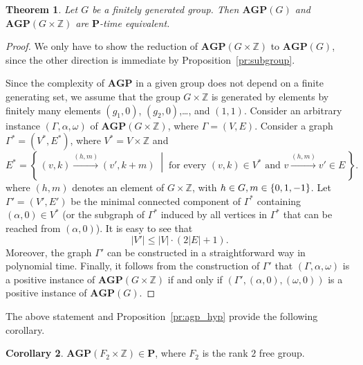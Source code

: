 \documentclass[10pt]{amsart}
\newcommand{\Set}[2]{\left\{\, #1 \;\middle|\; #2 \,\right\}}%
\newtheorem{theorem}{Theorem}[section]
\theoremstyle{definition}
\newtheorem{corollary}[theorem]{Corollary}
\def\P{{\mathbf{P}}}
\def\AGP{{\mathbf{AGP}}}
\begin{document}
\begin{theorem}\label{th:kill_z}
Let $G$ be a finitely generated group. Then $\AGP(G)$ and $\AGP(G\times \mathbb Z)$ are $\P$-time equivalent.
\end{theorem}

\begin{proof}
We only have to show the reduction of $\AGP(G\times\mathbb Z)$ to $\AGP(G)$, since the other direction is immediate by Proposition~\ref{pr:subgroup}.

Since the complexity of $\AGP$ in a given group does not depend on a finite generating set, we assume that the group $G\times\mathbb Z$ is generated by elements by finitely many elements $(g_1,0)$, $(g_2,0)$,\ldots, and $(1,1)$. Consider an arbitrary instance $(\Gamma,\alpha,\omega)$ of $\AGP(G\times \mathbb Z)$, where $\Gamma = (V,E)$.
Consider a graph $\Gamma^\ast = (V^\ast,E^\ast)$, where $V^\ast = V\times \mathbb Z$ and
$$
E^\ast = \Set{(v,k) \stackrel{(h,m)}{\to} (v',k+m)}{\mbox{for every }(v,k) \in V^\ast \mbox{ and } v \stackrel{(h,m)}{\to} v' \in E}.
$$
where $(h,m)$ denotes an element of $G\times\mathbb Z$, with $h\in G,m\in \mathbb \{0,1,-1\}$.
Let $\Gamma'= (V', E')$ be the minimal connected component of $\Gamma^\ast$ containing $(\alpha,0) \in V^\ast$
(or the subgraph of $\Gamma^\ast$ induced by all vertices in $\Gamma^\ast$ that can be reached from $(\alpha,0)$).
It is easy to see that
$$|V'| \le |V| \cdot (2|E|+1).$$
Moreover, the graph $\Gamma'$ can be constructed in a straightforward way in polynomial time.
Finally, it follows from the construction of $\Gamma'$ that $(\Gamma,\alpha,\omega)$ is a positive instance
of $\AGP(G\times \mathbb Z)$ if and only if
$(\Gamma',(\alpha,0),(\omega,0))$ is a positive instance of $\AGP(G)$.
\end{proof}

The above statement and Proposition~\ref{pr:agp_hyp} provide the following corollary.
\begin{corollary}\label{co:F2xZ}
$\AGP(F_2\times \mathbb Z) \in \P$, where $F_2$ is the rank $2$ free group.
\end{corollary}
\end{document}
